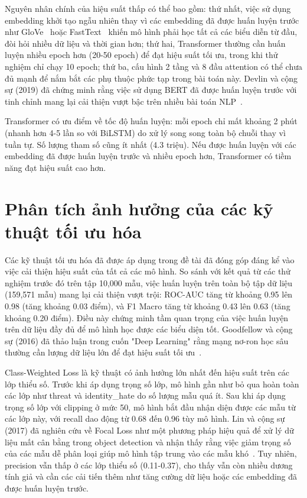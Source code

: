 \documentclass[../BTL.tex]{subfiles}
\begin{document}
Nguyên nhân chính của hiệu suất thấp có thể bao gồm: thứ nhất, việc sử dụng embedding khởi tạo ngẫu nhiên thay vì các embedding đã được huấn luyện trước như GloVe~\cite{pennington2014glove} hoặc FastText~\cite{mikolov2013word2vec} khiến mô hình phải học tất cả các biểu diễn từ đầu, đòi hỏi nhiều dữ liệu và thời gian hơn; thứ hai, Transformer thường cần huấn luyện nhiều epoch hơn (20-50 epoch) để đạt hiệu suất tối ưu, trong khi thử nghiệm chỉ chạy 10 epoch; thứ ba, cấu hình 2 tầng và 8 đầu attention có thể chưa đủ mạnh để nắm bắt các phụ thuộc phức tạp trong bài toán này. Devlin và cộng sự (2019) đã chứng minh rằng việc sử dụng BERT đã được huấn luyện trước với tinh chỉnh mang lại cải thiện vượt bậc trên nhiều bài toán NLP~\cite{devlin2019bert}.

Transformer có ưu điểm về tốc độ huấn luyện: mỗi epoch chỉ mất khoảng 2 phút (nhanh hơn 4-5 lần so với BiLSTM) do xử lý song song toàn bộ chuỗi thay vì tuần tự. Số lượng tham số cũng ít nhất (4.3 triệu). Nếu được huấn luyện với các embedding đã được huấn luyện trước và nhiều epoch hơn, Transformer có tiềm năng đạt hiệu suất cao hơn.

\section{Phân tích ảnh hưởng của các kỹ thuật tối ưu hóa}

Các kỹ thuật tối ưu hóa đã được áp dụng trong đề tài đã đóng góp đáng kể vào việc cải thiện hiệu suất của tất cả các mô hình. So sánh với kết quả từ các thử nghiệm trước đó trên tập 10,000 mẫu, việc huấn luyện trên toàn bộ tập dữ liệu (159,571 mẫu) mang lại cải thiện vượt trội: ROC-AUC tăng từ khoảng 0.95 lên 0.98 (tăng khoảng 0.03 điểm), và F1 Macro tăng từ khoảng 0.43 lên 0.63 (tăng khoảng 0.20 điểm). Điều này chứng minh tầm quan trọng của việc huấn luyện trên dữ liệu đầy đủ để mô hình học được các biểu diện tốt. Goodfellow và cộng sự (2016) đã thảo luận trong cuốn "Deep Learning" rằng mạng nơ-ron học sâu thường cần lượng dữ liệu lớn để đạt hiệu suất tối ưu~\cite{goodfellow2016deep}.

Class-Weighted Loss là kỹ thuật có ảnh hưởng lớn nhất đến hiệu suất trên các lớp thiểu số. Trước khi áp dụng trọng số lớp, mô hình gần như bỏ qua hoàn toàn các lớp như threat và identity\_hate do số lượng mẫu quá ít. Sau khi áp dụng trọng số lớp với clipping ở mức 50, mô hình bắt đầu nhận diện được các mẫu từ các lớp này, với recall dao động từ 0.68 đến 0.96 tùy mô hình. Lin và cộng sự (2017) đã nghiên cứu về Focal Loss như một phương pháp hiệu quả để xử lý dữ liệu mất cân bằng trong object detection và nhận thấy rằng việc giảm trọng số của các mẫu dễ phân loại giúp mô hình tập trung vào các mẫu khó~\cite{lin2017focal}. Tuy nhiên, precision vẫn thấp ở các lớp thiểu số (0.11-0.37), cho thấy vẫn còn nhiều dương tính giả và cần các cải tiến thêm như tăng cường dữ liệu hoặc các embedding đã được huấn luyện trước.
\end{document}

